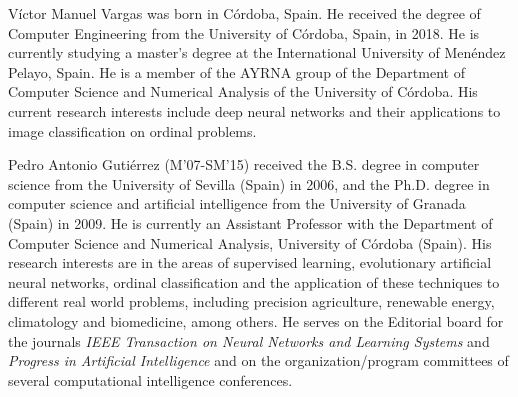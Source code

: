 \documentclass[journal]{IEEEtran}
\begin{document}
	\begin{IEEEbiography}{Víctor Manuel Vargas} was born in Córdoba, Spain. He received the degree of Computer Engineering from the University of Córdoba, Spain, in 2018. He is currently studying a master's degree at the International University of Menéndez Pelayo, Spain. He is a member of the AYRNA group of the Department of Computer Science and Numerical Analysis of the University of Córdoba. His current research interests include deep neural networks and their applications to image classification on ordinal problems.

	\end{IEEEbiography}
	
	
	\begin{IEEEbiography}{Pedro Antonio Gutiérrez}  (M'07-SM'15) received the B.S. degree in computer science from the University of Sevilla (Spain) in 2006, and the Ph.D. degree in computer science and artificial intelligence from the University of Granada (Spain) in 2009. He is currently an Assistant Professor with the Department of Computer Science and Numerical Analysis, University of Córdoba (Spain).
		His research interests are in the areas of supervised learning, evolutionary artificial neural networks, ordinal classification and the application of these techniques to different real world problems, including precision agriculture, renewable energy, climatology and biomedicine, among others. He serves on the Editorial board for the journals \textit{IEEE Transaction on Neural Networks and Learning Systems} and \textit{Progress in Artificial Intelligence} and on the organization/program committees of several computational intelligence conferences.
	\end{IEEEbiography}
\end{document}
